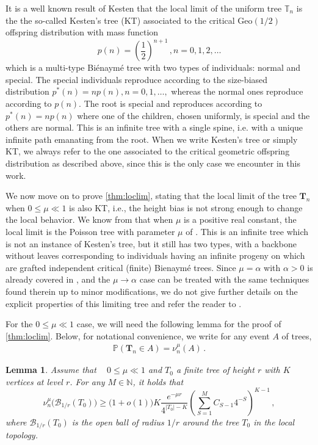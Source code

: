 \documentclass{article}
\newcommand{\pr}{\mathbb{P}}								%
\newcommand{\Prob}[1]{\pr\left(#1\right)}					%
\newcommand{\1}{\mathbbm{1}}								%
\newtheorem{lemma}[theorem]{Lemma}
\theoremstyle{definition}
\numberwithin{equation}{section}
\newcommand{\bT}{\mathbf T}
\newcommand{\T}{\mathbb T}
\begin{document}
It is a well known result of Kesten \cite{kesten1986subdiffusive} that the local limit of the uniform tree $\T_n$ is the the so-called Kesten's tree (KT) associated to the critical $\mathrm{Geo}(1/2)$ offspring distribution with mass function 
$$p(n)=\left( \frac 1 2 \right)^{n+1} \, ,n=0,1,2,\dots$$
which is a multi-type Biénaymé tree with two types of individuals: normal and special. The special individuals reproduce according to the size-biased distribution $p^*(n)=np(n), n=0,1,\dots,$ whereas the normal ones reproduce according to $p(n)$. The root is special and reproduces according to $p^*(n)=np(n)$ where one of the children, chosen uniformly, is special and the others are normal. This is an infinite tree with a single spine, i.e. with a unique infinite path emanating from the root. When we write Kesten's tree or simply KT, we always refer to the one associated to the critical geometric offspring distribution {as described above}, since this is the only case we encounter in this work. 

\medskip

We now move on to prove \cref{thm:loclim}, stating that the local limit of the tree $\mathbf{T}_n$ when $0 \leq \mu \ll 1$ is also KT, i.e., the height bias is not strong enough to change the local behavior. We know from \cite{durhuus2023trees} that when $\mu$ is a positive real constant, the local limit is the Poisson tree with parameter $\mu$ of \cite{abraham2020very}. This is an infinite tree which is not an instance of Kesten's tree, but it still has two types, with a backbone without leaves corresponding to
individuals having an infinite progeny on which are
grafted independent critical (finite) Bienaymé trees. Since $\mu = \alpha$ with $\alpha>0$ is already covered in \cite{durhuus2023trees}, and the $\mu \to \alpha$ case can be treated with the same techniques found therein up to minor modifications, we do not give further details on the explicit properties of this limiting tree and refer the reader to \cite{abraham2020very,durhuus2023trees}.

For the $0 \leq \mu \ll 1$ case,
we will need the following lemma for the proof of \cref{thm:loclim}. Below, for notational convenience, we write for any event $A$ of trees,
\begin{align*}
    \Prob{\bT_n \in A}=\nu_n^\mu(A)\,.
\end{align*}

\begin{lemma} \label{lem:ballvol}
Assume that ~ $0 \leq \mu \ll 1$ and $T_0$ a finite tree of height $r$ with $K$ vertices at level $r$. For any $M \in \mathbb{N}$, it holds that
\begin{equation} \label{ballvol}
\nu_n ^\mu \big(\mathcal{B}_{1/r} (T_0) \big) \geq\big(1 + o(1)\big)K \frac{e^{-\mu r}}{4^{|T_0| -K}} \left( \sum\limits_{S=1} ^M  C_{S-1} 4^{-S} \right)^{K-1} \, ,
\end{equation}
where $\mathcal{B}_{1/r}(T_0)$ is the open ball of radius $1/r$ around the tree $T_0$ in the local topology.
\end{lemma}
\end{document}
